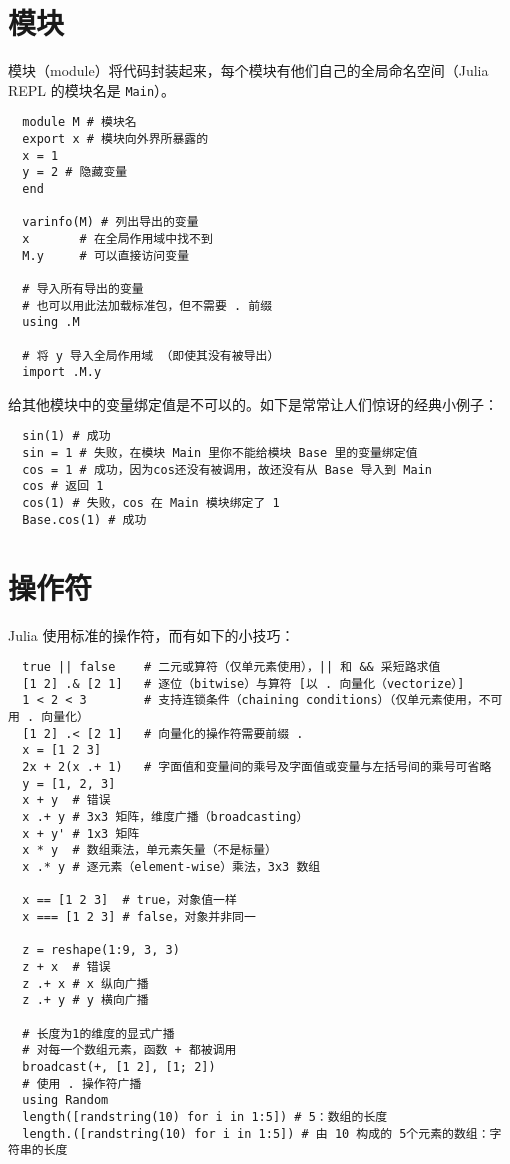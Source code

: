\documentclass[10pt,a4paper]{article}
\begin{document}
\section{模块}
模块（module）将代码封装起来，每个模块有他们自己的全局命名空间（Julia REPL 的模块名是 \lstinline|Main|）。
\begin{lstlisting}
  module M # 模块名
  export x # 模块向外界所暴露的
  x = 1
  y = 2 # 隐藏变量
  end

  varinfo(M) # 列出导出的变量
  x       # 在全局作用域中找不到
  M.y     # 可以直接访问变量

  # 导入所有导出的变量
  # 也可以用此法加载标准包，但不需要 . 前缀
  using .M

  # 将 y 导入全局作用域 （即使其没有被导出）
  import .M.y
\end{lstlisting}
给其他模块中的变量绑定值是不可以的。如下是常常让人们惊讶的经典小例子：
\begin{lstlisting}
  sin(1) # 成功
  sin = 1 # 失败，在模块 Main 里你不能给模块 Base 里的变量绑定值
  cos = 1 # 成功，因为cos还没有被调用，故还没有从 Base 导入到 Main
  cos # 返回 1
  cos(1) # 失败，cos 在 Main 模块绑定了 1
  Base.cos(1) # 成功
\end{lstlisting}

\section{操作符}
Julia 使用标准的操作符，而有如下的小技巧：
\begin{lstlisting}
  true || false    # 二元或算符（仅单元素使用），|| 和 && 采短路求值
  [1 2] .& [2 1]   # 逐位（bitwise）与算符 [以 . 向量化（vectorize）]
  1 < 2 < 3        # 支持连锁条件（chaining conditions）（仅单元素使用，不可用 . 向量化）
  [1 2] .< [2 1]   # 向量化的操作符需要前缀 .
  x = [1 2 3]
  2x + 2(x .+ 1)   # 字面值和变量间的乘号及字面值或变量与左括号间的乘号可省略
  y = [1, 2, 3]
  x + y  # 错误
  x .+ y # 3x3 矩阵，维度广播（broadcasting）
  x + y' # 1x3 矩阵
  x * y  # 数组乘法，单元素矢量（不是标量）
  x .* y # 逐元素（element-wise）乘法，3x3 数组

  x == [1 2 3]  # true，对象值一样
  x === [1 2 3] # false，对象并非同一

  z = reshape(1:9, 3, 3)
  z + x  # 错误
  z .+ x # x 纵向广播
  z .+ y # y 横向广播

  # 长度为1的维度的显式广播
  # 对每一个数组元素，函数 + 都被调用
  broadcast(+, [1 2], [1; 2])
  # 使用 . 操作符广播
  using Random
  length([randstring(10) for i in 1:5]) # 5：数组的长度
  length.([randstring(10) for i in 1:5]) # 由 10 构成的 5个元素的数组：字符串的长度
\end{lstlisting}
\end{document}
